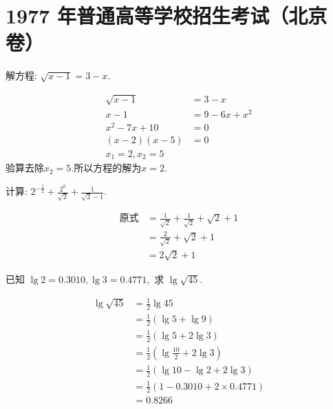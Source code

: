 \section*{1977 年普通高等学校招生考试（北京卷） }

\begin{questions}
	\question 解方程: \( \sqrt{x - 1} = 3 - x \).
	\begin{solution}
		\begin{align*}
			\sqrt{x - 1}  & = 3 - x        \\
			x - 1         & = 9 - 6x + x^2 \\
			x^2 - 7x + 10 & = 0            \\
			(x-2)(x-5)    & = 0            \\
			x_1 = 2, x_2 = 5
		\end{align*}
		验算去除$x_2=5$.所以方程的解为$x=2$.
	\end{solution}

	\question 计算: \( 2^{-\frac12} + \frac{2^0}{\sqrt{2}} + \frac{1}{\sqrt{2} - 1}. \)

	\begin{solution}
		\begin{align*}
			\text{原式} & = \frac{1}{\sqrt{2}} + \frac{1}{\sqrt{2}} + \sqrt{2} + 1 \\
			          & = \frac{2}{\sqrt{2}} + \sqrt{2} + 1                      \\
			          & = 2\sqrt{2} + 1
		\end{align*}
	\end{solution}

	\question 已知 \( \lg2 = 0.3010, \lg3 = 0.4771, \) 求 \( \lg\sqrt{45} \).

	\begin{solution}
		\begin{align*}
			\lg\sqrt{45} & = \frac12\lg{45}                        \\
			             & = \frac12(\lg5 + \lg9)                  \\
			             & = \frac12(\lg5 + 2\lg3)                 \\
			             & = \frac12(\lg\frac{10}{2} + 2\lg3)      \\
			             & = \frac12(\lg10 - \lg2 + 2\lg3)         \\
			             & = \frac12(1 - 0.3010 + 2 \times 0.4771) \\
			             & = 0.8266
		\end{align*}
	\end{solution}


\end{questions}

